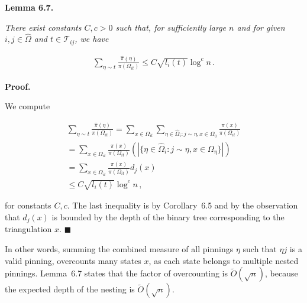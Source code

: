 \par\medskip\noindent\textbf{\textbf{Lemma 6.7}\textbf{.}}\par



\emph{There exist constants $C,c>0$ such that, for sufficiently large $n$ and for given $i,j\in\hat{\Omega}$ and $t\in\mathcal{T}_{ij}$, we have}\par


\[\begin{gathered}
\sum_{\eta\sim t}\frac{\hat{\pi}(\eta)}{\pi(\Omega_{it})}\leq C\sqrt{l_{i}(t)}\log^{c}n\,.
\end{gathered}\]






\par\medskip\noindent\textbf{Proof.}\par



We compute\par


\[\begin{gathered}
\displaystyle\sum_{\eta\sim t}\frac{\hat{\pi}(\eta)}{\pi(\Omega_{it})} \displaystyle=\sum_{x\in\Omega_{it}}\sum_{\eta\in\hat{\Omega}_{i}:j\sim\eta,x\in\Omega_{\eta}}\frac{\pi(x)}{\pi(\Omega_{it})} \\
\displaystyle=\sum_{x\in\Omega_{it}}\frac{\pi(x)}{\pi(\Omega_{it})}\left(|\{\eta\in\hat{\Omega}_{i}:j\sim\eta,x\in\Omega_{\eta}\}|\right) \\
\displaystyle=\sum_{x\in\Omega_{it}}\frac{\pi(x)}{\pi(\Omega_{it})}d_{j}(x) \\
\displaystyle\leq C\sqrt{l_{i}(t)}\log^{c}n\,,
\end{gathered}\]


for constants $C,c$.
The last inequality is by Corollary 6.5 and by the observation that $d_{j}(x)$ is bounded by the depth of the binary tree corresponding to the triangulation $x$.
\ensuremath{\blacksquare}\par





In other words, summing the combined measure of all pinnings $\eta$ such that $\eta j$ is a valid pinning, overcounts many states $x$, as each state belongs to multiple nested pinnings. Lemma 6.7 states that the factor of overcounting is $\widetilde{O}(\sqrt{n})$, because the expected depth of the nesting is $\widetilde{O}(\sqrt{n})$.\par




